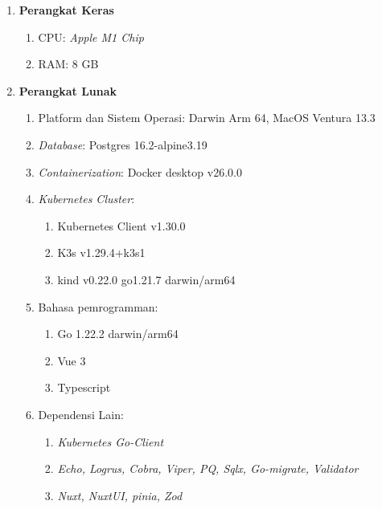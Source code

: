 \begin{enumerate}
  \item \textbf{Perangkat Keras}

        \begin{enumerate}
          \item CPU: \textit{Apple M1 Chip}
          \item RAM: 8 GB
        \end{enumerate}

  \item \textbf{Perangkat Lunak}

        \begin{enumerate}
          \item Platform dan Sistem Operasi: Darwin Arm 64, MacOS Ventura 13.3
          \item \textit{Database}: Postgres 16.2-alpine3.19
          \item \textit{Containerization}: Docker desktop v26.0.0
          \item \textit{Kubernetes Cluster}:
                \begin{enumerate}
                  \item Kubernetes Client v1.30.0
                  \item K3s v1.29.4+k3s1
                  \item kind v0.22.0 go1.21.7 darwin/arm64
                \end{enumerate}
          \item Bahasa pemrogramman:
                \begin{enumerate}
                  \item Go 1.22.2 darwin/arm64
                  \item Vue 3
                  \item Typescript
                \end{enumerate}
          \item Dependensi Lain:
                \begin{enumerate}
                  \item \textit{Kubernetes Go-Client}
                  \item \textit{Echo, Logrus, Cobra, Viper, PQ, Sqlx, Go-migrate, Validator}
                  \item \textit{Nuxt, NuxtUI, pinia, Zod}
                \end{enumerate}
        \end{enumerate}
\end{enumerate}